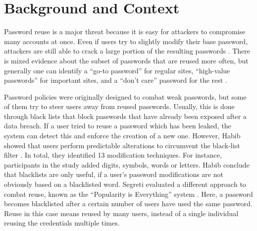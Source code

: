\section{Background and Context}
Password reuse is a major threat because it is easy for attackers to compromise many accounts at once. Even if users try to slightly modify their base password, attackers are still able to crack a large portion of the resulting passwords \cite{Das2014TangledWeb,Jaeger2016AnalysisOfLeaks}. There is mixed evidence about the subset of passwords that are reused more often, but generally one can identify a ``go-to password'' for regular sites, ``high-value passwords'' for important sites, and a ``don't care'' password for the rest \cite{Bailey2014StatisticsReuse, Florencio2007LargeScaleStudyPasswordHabits, Haque2014Hierarchy, Stobert2014PasswordLifeCycle, Stobert2015ExpertPassword, Ur2015PWCreationLab, Wash2016UnderstandingPasswordChoices}. 

Password policies were originally designed to combat weak passwords, but some of them try to steer users away from reused passwords. Usually, this is done through black lists that block passwords that have already been exposed after a data breach. If a user tried to reuse a password which has been leaked, the system can detect this and enforce the creation of a new one. However, Habib \etal showed that users perform predictable alterations to circumvent the black-list filter \cite{Habib2017Blacklists}. In total, they identified 13 modification techniques. For instance, participants in the study added digits, symbols, words or letters. Habib \etal conclude that blacklists are only useful, if a user's password modifications are not obviously based on a blacklisted word. Segreti \etal evaluated a different approach to combat reuse, known as the ``Popularity is Everything'' system \cite{Segreti2017AdaptivePolicies}. Here, a password becomes blacklisted after a certain number of users have used the same password. Reuse in this case means reused by many users, instead of a single individual reusing the credentials multiple times. 

